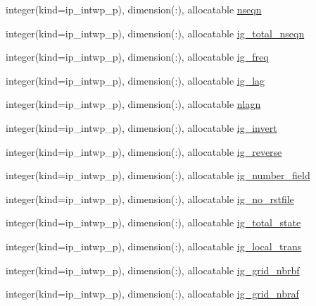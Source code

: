 \begin{DoxyCompactItemize}
integer(kind=ip\+\_\+intwp\+\_\+p), dimension(\+:), allocatable \hyperlink{namespacemod__oasis__namcouple_a20e9486f3e8bbdcee0de935e9be3a2e8}{nseqn}
\item 
integer(kind=ip\+\_\+intwp\+\_\+p), dimension(\+:), allocatable \hyperlink{namespacemod__oasis__namcouple_a09ed8be682296ef584f0d5777b2c6482}{ig\+\_\+total\+\_\+nseqn}
\item 
integer(kind=ip\+\_\+intwp\+\_\+p), dimension(\+:), allocatable \hyperlink{namespacemod__oasis__namcouple_affa727bb033c0f4d09962f2b4d1b4ab5}{ig\+\_\+freq}
\item 
integer(kind=ip\+\_\+intwp\+\_\+p), dimension(\+:), allocatable \hyperlink{namespacemod__oasis__namcouple_ae2c74692147a54b3f7534301d509f766}{ig\+\_\+lag}
\item 
integer(kind=ip\+\_\+intwp\+\_\+p), dimension(\+:), allocatable \hyperlink{namespacemod__oasis__namcouple_aad06af35c92de78d71671d39bcbb1690}{nlagn}
\item 
integer(kind=ip\+\_\+intwp\+\_\+p), dimension(\+:), allocatable \hyperlink{namespacemod__oasis__namcouple_a0b8948452bbd8cf1dc9f0fccc17c344d}{ig\+\_\+invert}
\item 
integer(kind=ip\+\_\+intwp\+\_\+p), dimension(\+:), allocatable \hyperlink{namespacemod__oasis__namcouple_adc4dcf30da2b88fb1798dd02e7833bc1}{ig\+\_\+reverse}
\item 
integer(kind=ip\+\_\+intwp\+\_\+p), dimension(\+:), allocatable \hyperlink{namespacemod__oasis__namcouple_a0751f74f7ce6520d8e860b9da14d1d9d}{ig\+\_\+number\+\_\+field}
\item 
integer(kind=ip\+\_\+intwp\+\_\+p), dimension(\+:), allocatable \hyperlink{namespacemod__oasis__namcouple_a1cc3d37d7819c112f14b6cec03266561}{ig\+\_\+no\+\_\+rstfile}
\item 
integer(kind=ip\+\_\+intwp\+\_\+p), dimension(\+:), allocatable \hyperlink{namespacemod__oasis__namcouple_a7c783457d0e759e3af98b92146fa4ec3}{ig\+\_\+total\+\_\+state}
\item 
integer(kind=ip\+\_\+intwp\+\_\+p), dimension(\+:), allocatable \hyperlink{namespacemod__oasis__namcouple_a510a13e57f2f65d5ddc70c729d54c0f6}{ig\+\_\+local\+\_\+trans}
\item 
integer(kind=ip\+\_\+intwp\+\_\+p), dimension(\+:), allocatable \hyperlink{namespacemod__oasis__namcouple_ae81f2e658bbaeae20badef0fad425a69}{ig\+\_\+grid\+\_\+nbrbf}
\item 
integer(kind=ip\+\_\+intwp\+\_\+p), dimension(\+:), allocatable \hyperlink{namespacemod__oasis__namcouple_a8e8c38746c6c35b13d2d9b934835188c}{ig\+\_\+grid\+\_\+nbraf}

\end{DoxyCompactItemize}
